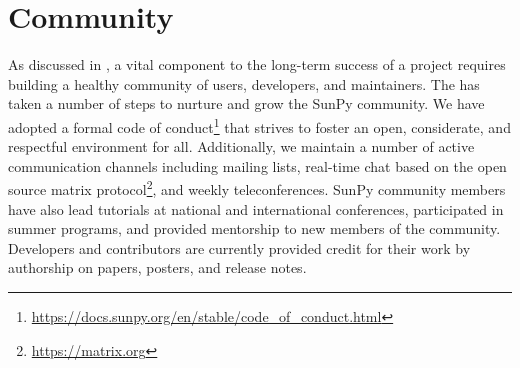 \section{Community}
\label{sec:community}

As discussed in \citet{bangerth2013}, a vital component to the long-term success of a project requires building a healthy community of users, developers, and maintainers.
The \sunpyproj has taken a number of steps to nurture and grow the SunPy community.
We have adopted a formal code of conduct\footnote{\url{https://docs.sunpy.org/en/stable/code_of_conduct.html}} that strives to foster an open, considerate, and respectful environment for all.
Additionally, we maintain a number of active communication channels including mailing lists, real-time chat based on the open source matrix protocol\footnote{\url{https://matrix.org}}, and weekly teleconferences.
SunPy community members have also lead tutorials at national and international conferences, participated in summer programs, and provided mentorship to new members of the community.
Developers and contributors are currently provided credit for their work by authorship on papers, posters, and release notes.
